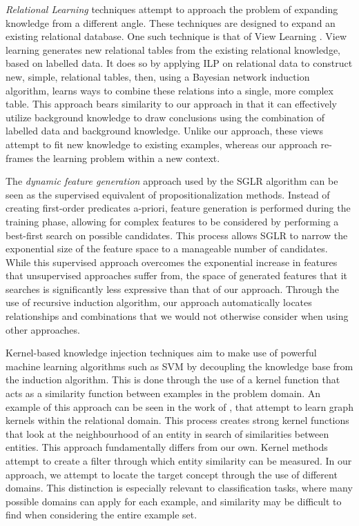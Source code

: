 \documentclass[twoside,11pt]{article}
\theoremstyle{definition}
\begin{document}
\emph{Relational Learning} techniques attempt to approach the problem of expanding knowledge from a different angle. These techniques are designed to expand an existing relational database. One such technique is that of View Learning . View learning generates new relational tables from the existing relational knowledge, based on labelled data.
It does so by applying ILP on relational data to construct new, simple, relational tables, then,  using a Bayesian network induction algorithm, learns ways to combine these relations into a single, more complex table.
This approach bears similarity to our approach in that it can effectively utilize background knowledge to draw conclusions using the combination of labelled data and background knowledge. Unlike our approach, these views attempt to fit new knowledge to existing examples, whereas our approach re-frames the learning problem within a new context.

The \emph{dynamic feature generation} approach used by the SGLR algorithm \cite{popescul200716} can be seen as the supervised equivalent of propositionalization methods. Instead of creating first-order predicates a-priori, feature generation is performed during the training phase, allowing for complex features to be considered by performing a best-first search on possible candidates.
This process allows SGLR to narrow the exponential size of the feature space to a manageable number of candidates.
While this supervised approach overcomes the exponential increase in features that unsupervised approaches suffer from, the space of generated features that it searches is significantly less expressive than that of our approach.
Through the use of recursive induction algorithm, our approach automatically locates relationships and combinations that we would not otherwise consider when using other approaches.

Kernel-based knowledge injection techniques aim to make use of powerful machine learning algorithms such as SVM by decoupling the knowledge base from the induction algorithm. This is done through the use of a kernel function that acts as a similarity function between examples in the problem domain. An example of this approach can be seen in the work of , that attempt to learn graph kernels within the relational domain. This process creates strong kernel functions that look at the neighbourhood of an entity in search of similarities between entities. This  approach fundamentally differs from our own. Kernel methods attempt to create a filter through which entity similarity can be measured. In our approach, we attempt to locate the target concept through the use of different domains. This distinction is especially relevant to classification tasks, where many possible domains can apply for each example, and similarity may be difficult to find when considering the entire example set.
\end{document}
